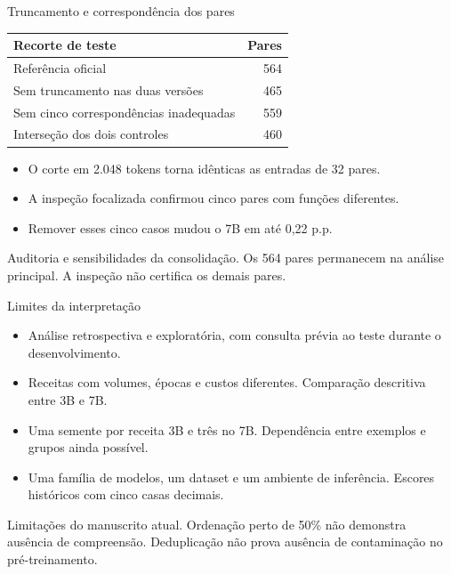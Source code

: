 \documentclass[aspectratio=169,11pt]{beamer}
\newcommand{\fonte}[1]{\par\vfill{\fontsize{7}{8.2}\selectfont\color{cinza}#1\par}}
\begin{document}
\begin{frame}[t]{Truncamento e correspondência dos pares}
\small
\begin{tabularx}{\linewidth}{@{}Xr@{}}
\toprule
Recorte de teste & Pares \\
\midrule
Referência oficial & 564 \\
Sem truncamento nas duas versões & 465 \\
Sem cinco correspondências inadequadas & 559 \\
Interseção dos dois controles & 460 \\
\bottomrule
\end{tabularx}
\par\medskip
\normalsize
\begin{itemize}
\item O corte em 2.048 tokens torna idênticas as entradas de 32 pares.
\item A inspeção focalizada confirmou cinco pares com funções diferentes.
\item Remover esses cinco casos mudou o 7B em até 0,22 p.p.
\end{itemize}
\fonte{Auditoria e sensibilidades da consolidação. Os 564 pares permanecem na análise principal. A inspeção não certifica os demais pares.}
\end{frame}

\begin{frame}[t]{Limites da interpretação}
\begin{itemize}
\setlength{\itemsep}{4mm}
\item Análise retrospectiva e exploratória, com consulta prévia ao teste durante o desenvolvimento.
\item Receitas com volumes, épocas e custos diferentes. Comparação descritiva entre 3B e 7B.
\item Uma semente por receita 3B e três no 7B. Dependência entre exemplos e grupos ainda possível.
\item Uma família de modelos, um dataset e um ambiente de inferência. Escores históricos com cinco casas decimais.
\end{itemize}
\fonte{Limitações do manuscrito atual. Ordenação perto de 50\% não demonstra ausência de compreensão. Deduplicação não prova ausência de contaminação no pré-treinamento.}
\end{frame}
\end{document}
